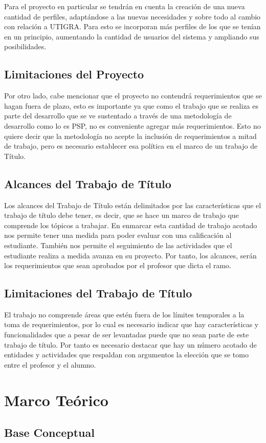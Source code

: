 \documentclass[a4paper,12pt,openany,oneside]{book}
\begin{document}
Para el proyecto en particular se tendrán en cuenta la creación de una nueva cantidad de perfiles, adaptándose a las nuevas necesidades y sobre todo al cambio con relación a UTIGRA. Para esto se incorporan más perfiles de los que se tenían en un principio, aumentando la cantidad de usuarios del sistema y ampliando sus posibilidades.
\section{Limitaciones del Proyecto}
Por otro lado, cabe mencionar que el proyecto no contendrá requerimientos que se hagan fuera de plazo, esto es importante ya que como el trabajo que se realiza es parte del desarrollo que se ve sustentado a través de una metodología de desarrollo como lo es PSP, no es conveniente agregar más requerimientos. Esto no quiere decir que la metodología no acepte la inclusión de requerimientos a mitad de trabajo, pero es necesario establecer esa política en el marco de un trabajo de Título.
\section{Alcances del Trabajo de Título}
Los alcances del Trabajo de Título están delimitados por las características que el trabajo de título debe tener, es decir, que se hace un marco de trabajo que comprende los tópicos a trabajar. En enmarcar esta cantidad de trabajo acotado nos permite tener una medida para poder evaluar con una calificación al estudiante. También nos permite el seguimiento de las actividades que el estudiante realiza a medida avanza en su proyecto. Por tanto, los alcances, serán los requerimientos que sean aprobados por el profesor que dicta el ramo.
\section{Limitaciones del Trabajo de Título}
El trabajo no comprende áreas que estén fuera de los límites temporales a la toma de requerimientos, por lo cual es necesario indicar que hay características y funcionalidades que a pesar de ser levantadas puede que no sean parte de este trabajo de título. Por tanto es necesario destacar que hay un número acotado de entidades y actividades que respaldan con argumentos la elección que se tomo entre el profesor y el alumno.
\chapter{Marco Teórico}
\thispagestyle{empty}
\section{Base Conceptual}
\end{document}
